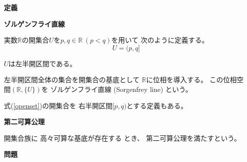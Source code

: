 \documentclass[12pt,b5paper]{ltjsarticle}
\begin{document}
\hrulefill
\textbf{定義}
\hrulefill

\textbf{ゾルゲンフライ直線}

実数$\mathbb{R}$の開集合$U$を$p,q\in\mathbb{R} \ ( p<q )$を用いて
次のように定義する。
\begin{equation}
 U = (p,q]
  \label{openset}
\end{equation}

$U$は左半開区間である。

左半開区間全体の集合を開集合の基底として
$\mathbb{R}$に位相を導入する。
この位相空間$(\mathbb{R},\{U\})$を
ゾルゲンフライ直線 (Sorgenfrey line)
という。

式(\ref{openset})の開集合を
右半開区間$[p,q)$とする定義もある。



\textbf{第二可算公理}

開集合族に
高々可算な基底が存在する
とき、
第二可算公理を満たすという。



\hrulefill
\textbf{問題}
\hrulefill
\end{document}
